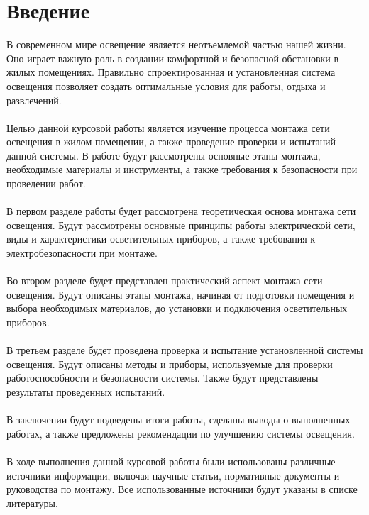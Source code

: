 \documentclass{article}
\begin{document}
\section{Введение}
В современном мире освещение является неотъемлемой частью нашей жизни. Оно играет важную роль в создании комфортной и безопасной обстановки в жилых помещениях. Правильно спроектированная и установленная система освещения позволяет создать оптимальные условия для работы, отдыха и развлечений.\\
~\\
Целью данной курсовой работы является изучение процесса монтажа сети освещения в жилом помещении, а также проведение проверки и испытаний данной системы. В работе будут рассмотрены основные этапы монтажа, необходимые материалы и инструменты, а также требования к безопасности при проведении работ.\\
~\\
В первом разделе работы будет рассмотрена теоретическая основа монтажа сети освещения. Будут рассмотрены основные принципы работы электрической сети, виды и характеристики осветительных приборов, а также требования к электробезопасности при монтаже.\\
~\\
Во втором разделе будет представлен практический аспект монтажа сети освещения. Будут описаны этапы монтажа, начиная от подготовки помещения и выбора необходимых материалов, до установки и подключения осветительных приборов.\\
~\\
В третьем разделе будет проведена проверка и испытание установленной системы освещения. Будут описаны методы и приборы, используемые для проверки работоспособности и безопасности системы. Также будут представлены результаты проведенных испытаний.\\
~\\
В заключении будут подведены итоги работы, сделаны выводы о выполненных работах, а также предложены рекомендации по улучшению системы освещения.\\
~\\
В ходе выполнения данной курсовой работы были использованы различные источники информации, включая научные статьи, нормативные документы и руководства по монтажу. Все использованные источники будут указаны в списке литературы.
\end{document}

